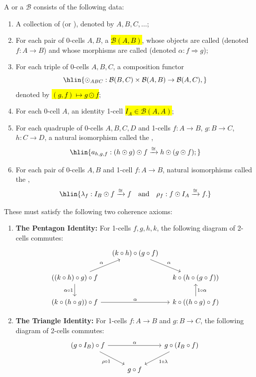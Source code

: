 \begin{definition} \label{definition:bicategory}
A  or a  $\mathcal{B}$ consists of the following data:
\begin{enumerate}
    \item A collection of  (or ), denoted by $A, B, C, \dots$;
    \item For each pair of 0-cells $A, B$, a  \hl{$\mathcal{B}(A, B)$}, whose objects are called  (denoted $f: A \to B$) and whose morphisms are called  (denoted $\alpha: f \Rightarrow g$);
    \item For each triple of 0-cells $A, B, C$, a composition functor
    $$\hlin{\odot_{ABC}: \mathcal{B}(B, C) \times \mathcal{B}(A, B) \to \mathcal{B}(A, C),}$$
    denoted by \hl{$(g, f) \mapsto g \odot f$};
    \item For each 0-cell $A$, an identity 1-cell \hl{$I_A \in \mathcal{B}(A, A)$};
    \item For each quadruple of 0-cells $A, B, C, D$ and 1-cells $f: A \to B$, $g: B \to C$, $h: C \to D$, a natural isomorphism called the ,
    $$\hlin{ a_{h,g,f}: (h \odot g) \odot f \xrightarrow{\cong} h \odot (g \odot f); }$$
    \item For each pair of 0-cells $A, B$ and 1-cell $f: A \to B$, natural isomorphisms called the ,
    $$\hlin{ \lambda_f: I_B \odot f \xrightarrow{\cong} f \quad \text{and} \quad \rho_f: f \odot I_A \xrightarrow{\cong} f.  }$$
\end{enumerate}
These must satisfy the following two coherence axioms:
\begin{enumerate}
    \item \textbf{The Pentagon Identity:} For 1-cells $f, g, h, k$, the following diagram of 2-cells commutes:
    $$
    \begin{tikzcd}[column sep=small]
        & (k \circ h) \circ (g \circ f) \arrow[dr, "\alpha"] & \\
        ((k \circ h) \circ g) \circ f \arrow[ur, "\alpha"] \arrow[d, "\alpha \circ 1"'] & & k \circ (h \circ (g \circ f)) \\
        (k \circ (h \circ g)) \circ f \arrow[rr, "\alpha"] & & k \circ ((h \circ g) \circ f) \arrow[u, "1 \circ \alpha"']
    \end{tikzcd}
    $$
    \item \textbf{The Triangle Identity:} For 1-cells $f: A \to B$ and $g: B \to C$, the following diagram of 2-cells commutes:
    $$
    \begin{tikzcd}
        (g \circ I_B) \circ f \arrow[rr, "\alpha"] \arrow[dr, "\rho \circ 1"'] & & g \circ (I_B \circ f) \arrow[dl, "1 \circ \lambda"] \\
        & g \circ f &
    \end{tikzcd}
    $$
\end{enumerate}
\end{definition}